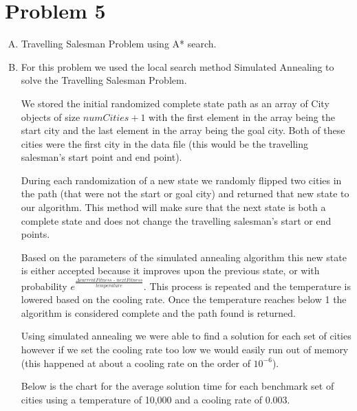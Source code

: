 \documentclass[10pt,a4paper]{article}
\begin{document}
	\section*{Problem 5}
	\begin{enumerate}[A.]
		
		\item
		
		Travelling Salesman Problem using A* search.
		
		\item 
		
		For this problem we used the local search method Simulated Annealing to solve the Travelling Salesman Problem.
		
		We stored the initial randomized complete state path as an array of City objects of size $\textit{numCities} + 1$ with the first element in the array being the start city and the last element in the array being the goal city. Both of these cities were the first city in the data file (this would be the travelling salesman's start point and end point). 
		
		During each randomization of a new state we randomly flipped two cities in the path (that were not the start or goal city) and returned that new state to our algorithm. This method will make sure that the next state is both a complete state and does not change the travelling salesman's start or end points.
		
		Based on the parameters of the simulated annealing algorithm this new state is either accepted because it improves upon the previous state, or with probability $e^{\frac{\Delta\textit{currentFitness - nextFitness}}{\textit{temperature}}}$. This process is repeated and the temperature is lowered based on the cooling rate. Once the temperature reaches below 1 the algorithm is considered complete and the path found is returned.
		
		Using simulated annealing we were able to find a solution for each set of cities however if we set the cooling rate too low we would easily run out of memory (this happened at about a cooling rate on the order of $10^{-6}$).
		
		Below is the chart for the average solution time for each benchmark set of cities using a temperature of 10,000 and a cooling rate of 0.003.
		

\end{enumerate}
\end{document}
